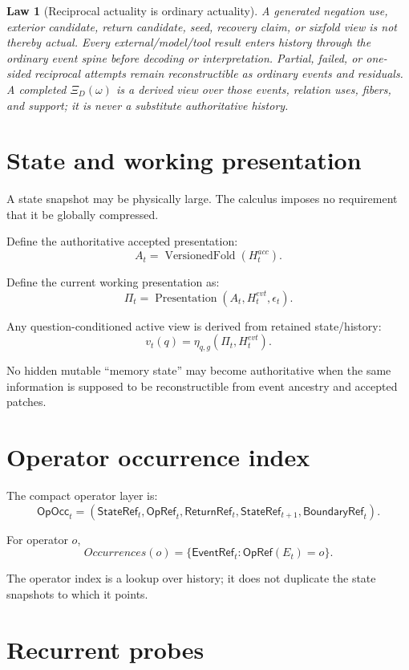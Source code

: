 \documentclass[11pt,oneside]{article}
\newtheorem{law}[definition]{Law}
\newcommand{\StateRef}{\mathsf{StateRef}}
\newcommand{\ReturnRef}{\mathsf{ReturnRef}}
\newcommand{\OpRef}{\mathsf{OpRef}}
\newcommand{\BoundaryRef}{\mathsf{BoundaryRef}}
\newcommand{\EventRef}{\mathsf{EventRef}}
\begin{document}
\begin{law}[Reciprocal actuality is ordinary actuality]\label{law:reciprocal-actuality}
A generated negation use, exterior candidate, return candidate, seed, recovery claim, or sixfold view is not thereby actual.  Every external/model/tool result enters history through the ordinary event spine before decoding or interpretation.  Partial, failed, or one-sided reciprocal attempts remain reconstructible as ordinary events and residuals.  A completed \(\Xi_D(\omega)\) is a derived view over those events, relation uses, fibers, and support; it is never a substitute authoritative history.
\end{law}

\section{State and working presentation}

A state snapshot may be physically large.  The calculus imposes no requirement that it be globally compressed.

Define the authoritative accepted presentation:
\[
\boxed{
A_t=\operatorname{VersionedFold}(H_t^{acc}).
}
\]

Define the current working presentation as:
\[
\boxed{
\Pi_t=\operatorname{Presentation}(A_t,H_t^{evt},\epsilon_t).
}
\]

Any question-conditioned active view is derived from retained state/history:
\[
v_t(q)=\eta_{q,g}(\Pi_t,H_t^{evt}).
\]

No hidden mutable ``memory state'' may become authoritative when the same information is supposed to be reconstructible from event ancestry and accepted patches.

\section{Operator occurrence index}

The compact operator layer is:
\[
\boxed{
\mathsf{OpOcc}_t
=
(
\StateRef_t,
\OpRef_t,
\ReturnRef_t,
\StateRef_{t+1},
\BoundaryRef_t
).
}
\]

For operator \(o\),
\[
\boxed{
Occurrences(o)
=
\{
\EventRef_t:
\OpRef(E_t)=o
\}.
}
\]

The operator index is a lookup over history; it does not duplicate the state snapshots to which it points.

\section{Recurrent probes}
\end{document}
